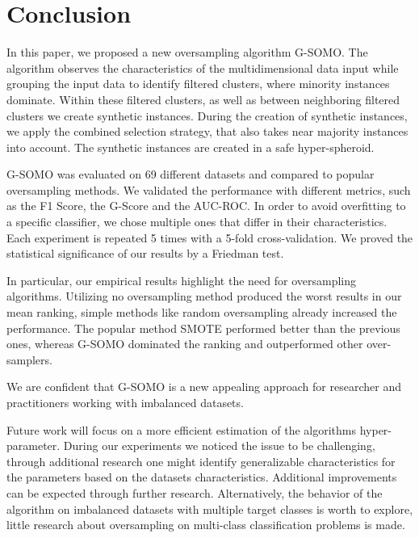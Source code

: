 \documentclass[parskip=full]{scrartcl}
\begin{document}
\section{Conclusion}

In this paper, we proposed a new oversampling algorithm G-SOMO. The algorithm 
observes the characteristics of the multidimensional data input while grouping
the input data to identify filtered clusters, where minority instances
dominate. Within these filtered clusters, as well as between neighboring
filtered clusters we create synthetic instances. During the creation of
synthetic instances, we apply the combined selection strategy, that also takes
near majority instances into account. The synthetic instances are created in a 
safe hyper-spheroid. 

G-SOMO was evaluated on 69 different datasets and compared to popular
oversampling methods. We validated the performance with different metrics, such
as the F1 Score, the G-Score and the AUC-ROC. In order to avoid overfitting to a
specific classifier, we chose multiple ones that differ in their
characteristics. Each experiment is repeated 5 times with a 5-fold
cross-validation. We proved the statistical significance of our results by a
Friedman test.

In particular, our empirical results highlight the need for oversampling
algorithms. Utilizing no oversampling method produced the worst results in our
mean ranking, simple methods like random oversampling already increased the
performance. The popular method SMOTE performed better than the previous ones,
whereas G-SOMO dominated the ranking and outperformed other over-samplers. 

We are confident that G-SOMO is a new appealing approach for researcher and
practitioners working with imbalanced datasets. 

Future work will focus on a more efficient estimation of the algorithms
hyper-parameter. During our experiments we noticed the issue to be challenging,
through additional research one might identify generalizable characteristics for
the parameters based on the datasets characteristics. Additional improvements
can be expected through further research. Alternatively, the behavior of the
algorithm on imbalanced datasets with multiple target classes is worth to
explore, little research about oversampling on multi-class classification
problems is made. 



\end{document}
